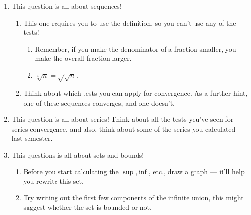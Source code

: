 \documentclass[
  10pt,
  a4paper]{article}
\providecommand{\tightlist}{%
  \setlength{\itemsep}{0pt}\setlength{\parskip}{0pt}}
\theoremstyle{plain}
\theoremstyle{definition}
\theoremstyle{plain}
\theoremstyle{plain}
\theoremstyle{plain}
\theoremstyle{plain}
\theoremstyle{definition}
\theoremstyle{definition}
\theoremstyle{remark}
\theoremstyle{remark}
\begin{document}
\begin{enumerate}
\def\labelenumi{\arabic{enumi})}
\tightlist
\item
  This question is all about sequences!

  \begin{enumerate}
  \def\labelenumii{\alph{enumii})}
  \tightlist
  \item
    This one requires you to use the definition, so you can't use any of the tests!

    \begin{enumerate}
    \def\labelenumiii{\roman{enumiii})}
    \tightlist
    \item
      Remember, if you make the denominator of a fraction smaller, you make the overall fraction larger.
    \item
      \(\sqrt[4]{n} = \sqrt{\sqrt{n}}\).
    \end{enumerate}
  \item
    Think about which tests you can apply for convergence. As a further hint, one of these sequences converges, and one doesn't.
  \end{enumerate}
\item
  This question is all about series! Think about all the tests you've seen for series convergence, and also, think about some of the series you calculated last semester.
\item
  This questions is all about sets and bounds!

  \begin{enumerate}
  \def\labelenumii{\alph{enumii})}
  \tightlist
  \item
    Before you start calculating the \(\sup\),\(\inf\), etc., draw a graph --- it'll help you rewrite this set.
  \item
    Try writing out the first few components of the infinite union, this might suggest whether the set is bounded or not.
  \end{enumerate}
\end{enumerate}
\end{document}
